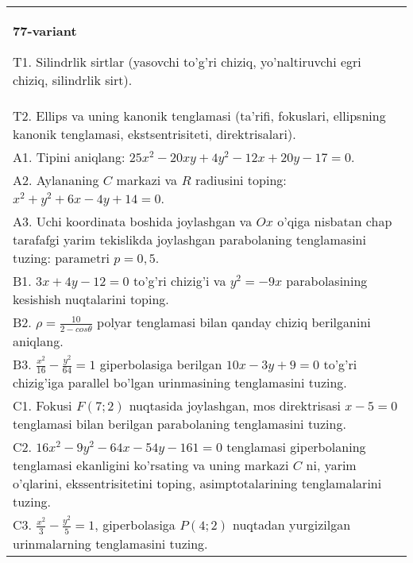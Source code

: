 \documentclass{article}
\begin{document}
\begin{tabular}{m{17cm}}
\textbf{77-variant}
\newline

T1. Silindrlik sirtlar (yasovchi to'g'ri chiziq, yo'naltiruvchi egri chiziq, silindrlik sirt).\\

T2. Ellips va uning kanonik tenglamasi (ta'rifi, fokuslari, ellipsning kanonik tenglamasi, ekstsentrisiteti, direktrisalari).\\

A1. Tipini aniqlang: $25x^{2}-20xy+4y^{2}-12x+20y-17=0$.\\

A2. Aylananing $C$ markazi va $R$ radiusini toping: $x^2+y^2+6x-4y+14=0$.\\

A3. Uchi koordinata boshida joylashgan va $Ox$ o'qiga nisbatan chap tarafafgi yarim tekislikda joylashgan parabolaning tenglamasini tuzing: parametri $p=0,5$.\\

B1. $3x + 4y - 12 = 0$ to'g'ri chizig'i va $y^{2} = - 9x$ parabolasining kesishish nuqtalarini toping.\\

B2. $\rho = \frac{10}{2 - cos\theta}$ polyar tenglamasi bilan qanday chiziq berilganini aniqlang.  \\

B3. $\frac{x^{2}}{16} - \frac{y^{2}}{64} = 1$ giperbolasiga berilgan $10x - 3y + 9 = 0$ to'g'ri chizig'iga parallel bo'lgan urinmasining tenglamasini tuzing.  \\

C1. Fokusi $F(7;2)$ nuqtasida joylashgan, mos direktrisasi $x - 5 = 0$ tenglamasi bilan berilgan parabolaning tenglamasini tuzing.  \\

C2. $16x^{2} - 9y^{2} - 64x - 54y - 161 = 0$ tenglamasi giperbolaning tenglamasi ekanligini ko'rsating va uning markazi $C$ ni, yarim o'qlarini, ekssentrisitetini toping, asimptotalarining tenglamalarini tuzing.  \\

C3. $\frac{x^{2}}{3} - \frac{y^{2}}{5} = 1$, giperbolasiga $P(4;2)$ nuqtadan yurgizilgan urinmalarning tenglamasini tuzing.  \\

\end{tabular}
\vspace{1cm}
\end{document}
